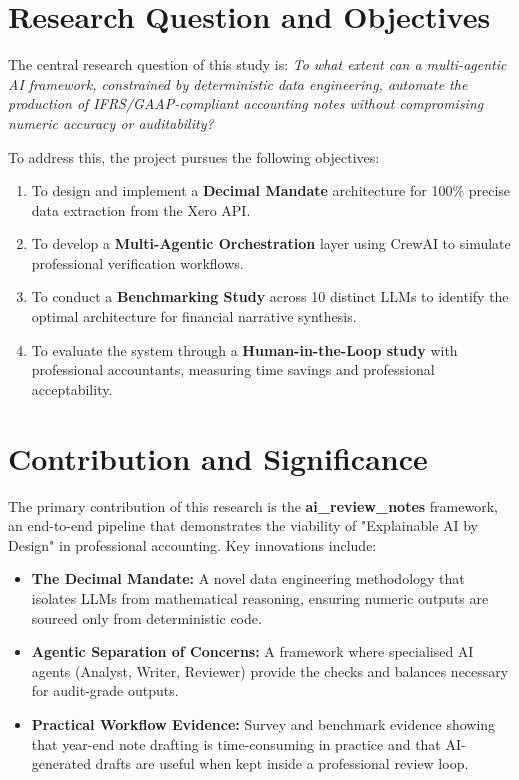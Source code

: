 \section{Research Question and Objectives}
The central research question of this study is: \textit{To what extent can a multi-agentic AI framework, constrained by deterministic data engineering, automate the production of IFRS/GAAP-compliant accounting notes without compromising numeric accuracy or auditability?}

To address this, the project pursues the following objectives:
\begin{enumerate}
    \item To design and implement a \textbf{Decimal Mandate} architecture for 100\% precise data extraction from the Xero API.
    \item To develop a \textbf{Multi-Agentic Orchestration} layer using CrewAI to simulate professional verification workflows.
    \item To conduct a \textbf{Benchmarking Study} across 10 distinct LLMs to identify the optimal architecture for financial narrative synthesis.
    \item To evaluate the system through a \textbf{Human-in-the-Loop study} with professional accountants, measuring time savings and professional acceptability.
\end{enumerate}

\section{Contribution and Significance}
The primary contribution of this research is the \textbf{ai\_review\_notes} framework, an end-to-end pipeline that demonstrates the viability of "Explainable AI by Design" in professional accounting. Key innovations include:
\begin{itemize}
    \item \textbf{The Decimal Mandate:} A novel data engineering methodology that isolates LLMs from mathematical reasoning, ensuring numeric outputs are sourced only from deterministic code.
    \item \textbf{Agentic Separation of Concerns:} A framework where specialised AI agents (Analyst, Writer, Reviewer) provide the checks and balances necessary for audit-grade outputs.
    \item \textbf{Practical Workflow Evidence:} Survey and benchmark evidence showing that year-end note drafting is time-consuming in practice and that AI-generated drafts are useful when kept inside a professional review loop.
\end{itemize}


